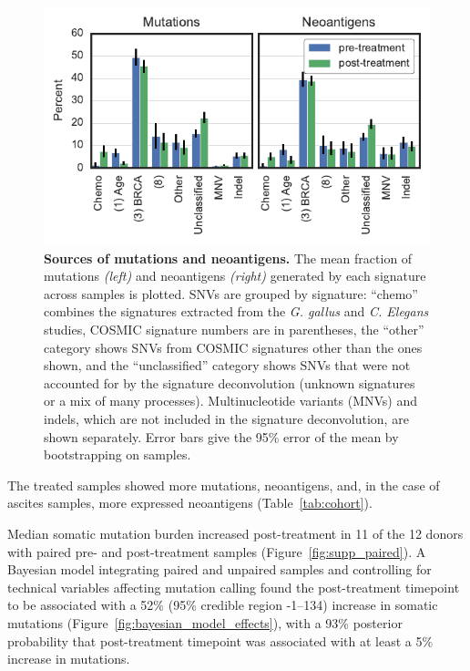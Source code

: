 \begin{figure}[htbp]
\centering
\includegraphics[scale=1.0]{figures/sources_of_mutations_and_neoantigens.pdf}
\caption{\textbf{Sources of mutations and neoantigens.}  The mean fraction of mutations \textit{(left)} and neoantigens \textit{(right)} generated by each signature across samples is plotted. SNVs are grouped by signature: ``chemo'' combines the signatures extracted from the \textit{G. gallus} and \textit{C. Elegans} studies, COSMIC signature numbers are in parentheses, the ``other'' category shows SNVs from COSMIC signatures other than the ones shown, and the ``unclassified'' category shows SNVs that were not accounted for by the signature deconvolution (unknown signatures or a mix of many processes). Multinucleotide variants (MNVs) and indels, which are not included in the signature deconvolution, are shown separately. Error bars give the 95\% error of the mean by bootstrapping on samples.}
\label{fig:sources}
\end{figure}

The treated samples showed more mutations, neoantigens, and, in the case of ascites samples, more expressed neoantigens (Table~\ref{tab:cohort}).

Median somatic mutation burden increased post-treatment in 11 of the 12 donors with paired pre- and post-treatment samples (Figure~\ref{fig:supp_paired}). A Bayesian model integrating paired and unpaired samples and controlling for technical variables affecting mutation calling found the post-treatment timepoint to be associated with a 52\% (95\% credible region -1--134) increase in somatic mutations (Figure~\ref{fig:bayesian_model_effects}), with a 93\% posterior probability that post-treatment timepoint was associated with at least a 5\% increase in mutations.

